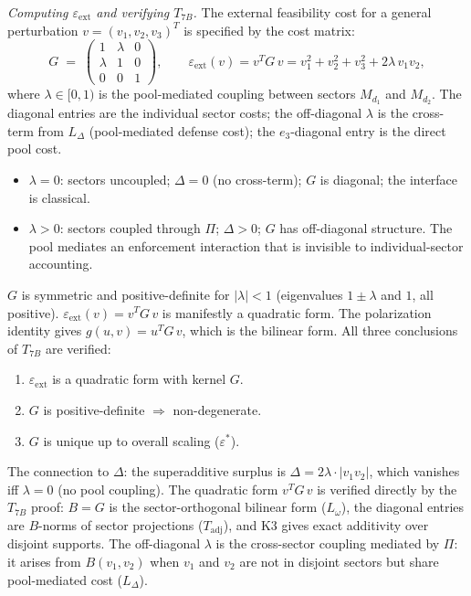 \documentclass[11pt,a4paper]{article}
\theoremstyle{definition}
\newcommand{\eps}{\varepsilon}
\newenvironment{varlist}{\begin{itemize}[nosep,leftmargin=2em]}{\end{itemize}}
\begin{document}
\smallskip\noindent\textit{Computing $\varepsilon_{\mathrm{ext}}$ and
verifying $T_{7B}$.}\quad
The external feasibility cost for a general perturbation
$v = (v_1, v_2, v_3)^T$ is specified by the cost matrix:
\[
  G \;=\; \begin{pmatrix}
    1 & \lambda & 0 \\
    \lambda & 1 & 0 \\
    0 & 0 & 1
  \end{pmatrix},
  \qquad
  \varepsilon_{\mathrm{ext}}(v) = v^T G\, v
  = v_1^2 + v_2^2 + v_3^2 + 2\lambda\, v_1 v_2,
\]
where $\lambda \in [0, 1)$ is the pool-mediated coupling between sectors
$M_{d_1}$ and $M_{d_2}$.  The diagonal entries are the individual sector
costs; the off-diagonal $\lambda$ is the cross-term from $L_\Delta$
(pool-mediated defense cost); the $e_3$-diagonal entry is the direct
pool cost.

\begin{varlist}
  \item $\lambda = 0$: sectors uncoupled; $\Delta = 0$ (no cross-term);
  $G$ is diagonal; the interface is classical.
  \item $\lambda > 0$: sectors coupled through $\Pi$; $\Delta > 0$;
  $G$ has off-diagonal structure.  The pool mediates an enforcement
  interaction that is invisible to individual-sector accounting.
\end{varlist}

\noindent $G$ is symmetric and positive-definite for $|\lambda| < 1$
(eigenvalues $1 \pm \lambda$ and $1$, all positive).
$\varepsilon_{\mathrm{ext}}(v) = v^T G\, v$ is manifestly a quadratic
form.  The polarization identity gives $g(u,v) = u^T G\, v$, which is
the bilinear form.  All three conclusions of $T_{7B}$ are verified:
\begin{enumerate}[label=(\roman*),nosep]
  \item $\varepsilon_{\mathrm{ext}}$ is a quadratic form with kernel $G$.
  \item $G$ is positive-definite $\Rightarrow$ non-degenerate.
  \item $G$ is unique up to overall scaling ($\eps^*$).
\end{enumerate}

The connection to $\Delta$: the superadditive surplus is
$\Delta = 2\lambda \cdot |v_1 v_2|$, which vanishes iff $\lambda = 0$
(no pool coupling).  The quadratic form $v^T G\, v$ is verified
directly by the $T_{7B}$ proof: $B = G$ is the sector-orthogonal
bilinear form ($L_\omega$), the diagonal entries are $B$-norms of
sector projections ($T_{\mathrm{adj}}$), and K3 gives exact additivity
over disjoint supports.  The off-diagonal $\lambda$ is the cross-sector
coupling mediated by $\Pi$: it arises from $B(v_1, v_2)$ when $v_1$ and
$v_2$ are not in disjoint sectors but share pool-mediated cost
($L_\Delta$).
\end{document}
